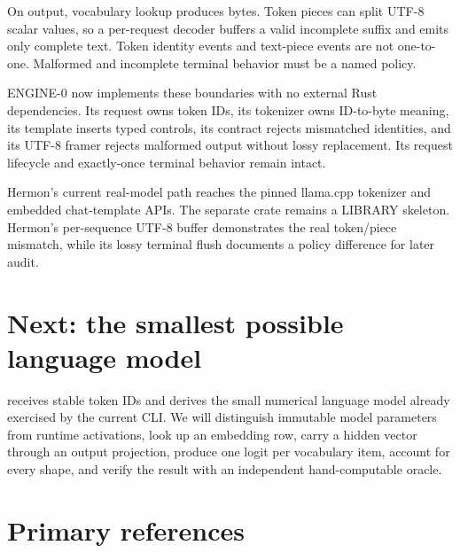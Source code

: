 On output, vocabulary lookup produces bytes. Token pieces can split
UTF-8 scalar values, so a per-request decoder buffers a valid incomplete
suffix and emits only complete text. Token identity events and
text-piece events are not one-to-one. Malformed and incomplete terminal
behavior must be a named policy.

ENGINE-0 now implements these boundaries with no external Rust
dependencies. Its request owns token IDs, its tokenizer owns ID-to-byte
meaning, its template inserts typed controls, its contract rejects
mismatched identities, and its UTF-8 framer rejects malformed output
without lossy replacement. Its request lifecycle and exactly-once
terminal behavior remain intact.

Hermon's current real-model path reaches the pinned llama.cpp tokenizer
and embedded chat-template APIs. The separate
\texttt{} crate remains a LIBRARY skeleton.
Hermon's per-sequence UTF-8 buffer demonstrates the real token/piece
mismatch, while its lossy terminal flush documents a policy difference
for later audit.

\section{Next: the smallest possible language
model}\label{next-the-smallest-possible-language-model}

 receives stable token IDs and derives the small numerical language
model already exercised by the current CLI. We will distinguish immutable
model parameters from runtime
activations, look up an embedding row, carry a hidden vector through an
output projection, produce one logit per vocabulary item, account for
every shape, and verify the result with an independent hand-computable
oracle.

\section{Primary references}\label{primary-references-1}


